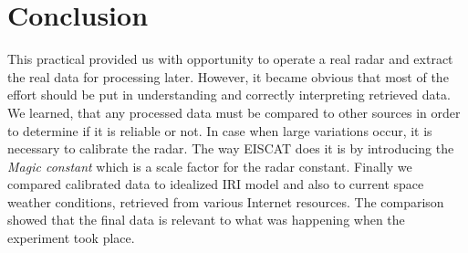\documentclass{article}
\begin{document}

\section{Conclusion}

This practical provided us with opportunity to operate a real radar and extract the real data for processing later. However, it became obvious that most of the effort should be put in understanding and correctly interpreting retrieved data. We learned, that any processed data must be compared to other sources in order to determine if it is reliable or not. In case when large variations occur, it is necessary to calibrate the radar. The way EISCAT does it is by introducing the \emph{Magic constant} which is a scale factor for the radar constant. Finally we compared calibrated data to idealized IRI model and also to current space weather conditions, retrieved from various Internet resources. The comparison showed that the final data is relevant to what was happening when the experiment took place.
\end{document}

